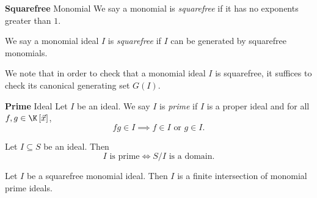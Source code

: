 \documentclass[co439]{subfiles}
\begin{document}
    \rruleline
    
    \begin{definition}{\textbf{Squarefree} Monomial}
        We say a monomial is \emph{squarefree} if it has no exponents greater than $1$.

        We say a monomial ideal $I$ is \emph{squarefree} if $I$ can be generated by squarefree monomials.
    \end{definition}
    
    \np We note that in order to check that a monomial ideal $I$ is squarefree, it suffices to check its canonical generating set $G\left( I \right)$.
    
    \begin{recall}{\textbf{Prime} Ideal}
        Let $I$ be an ideal. We say $I$ is \emph{prime} if $I$ is a proper ideal and for all $f,g\in\K\left[ \vec{x} \right]$,
        \begin{equation*}
            fg\in I\implies f\in I\text{ or }g\in I.
        \end{equation*}
    \end{recall}

    \begin{prop}{}
        Let $I\subseteq S$ be an ideal. Then
        \begin{equation*}
            \text{$I$ is prime} \iff \text{$S /I$ is a domain}.
        \end{equation*}
    \end{prop}

    \rruleline
    
    \begin{prop}{}
        Let $I$ be a squarefree monomial ideal. Then $I$ is a finite intersection of monomial prime ideals.
    \end{prop}
\end{document}
